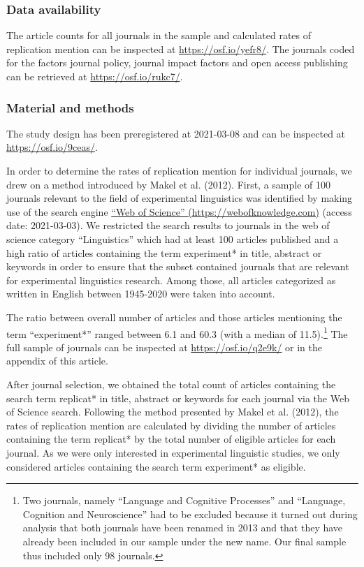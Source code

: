 \documentclass[]{elsarticle} %
\begin{document}
\hypertarget{data-availability}{%
\subsubsection{Data availability}\label{data-availability}}

The article counts for all journals in the sample and calculated rates of replication mention can be inspected at \url{https://osf.io/yefr8/}. The journals coded for the factors journal policy, journal impact factors and open access publishing can be retrieved at \url{https://osf.io/rukc7/}.

\hypertarget{material-and-methods}{%
\subsubsection{Material and methods}\label{material-and-methods}}

The study design has been preregistered at 2021-03-08 and can be inspected at \url{https://osf.io/9ceas/}.

In order to determine the rates of replication mention for individual journals, we drew on a method introduced by Makel et al. (2012).
First, a sample of 100 journals relevant to the field of experimental linguistics was identified by making use of the search engine \href{https://webofknowledge.com}{``Web of Science'' (https://webofknowledge.com)} (access date: 2021-03-03). We restricted the search results to journals in the web of science category ``Linguistics'' which had at least 100 articles published and a high ratio of articles containing the term experiment* in title, abstract or keywords in order to ensure that the subset contained journals that are relevant for experimental linguistics research. Among those, all articles categorized as written in English between 1945-2020 were taken into account.

The ratio between overall number of articles and those articles mentioning the term ``experiment*'' ranged between 6.1 and 60.3 (with a median of 11.5).\footnote{Two journals, namely ``Language and Cognitive Processes'' and ``Language, Cognition and Neuroscience'' had to be excluded because it turned out during analysis that both journals have been renamed in 2013 and that they have already been included in our sample under the new name. Our final sample thus included only 98 journals.}
The full sample of journals can be inspected at \url{https://osf.io/q2e9k/} or in the appendix of this article.

After journal selection, we obtained the total count of articles containing the search term replicat* in title, abstract or keywords for each journal via the Web of Science search.
Following the method presented by Makel et al. (2012), the rates of replication mention are calculated by dividing the number of articles containing the term replicat* by the total number of eligible articles for each journal. As we were only interested in experimental linguistic studies, we only considered articles containing the search term experiment* as eligible.
\end{document}
